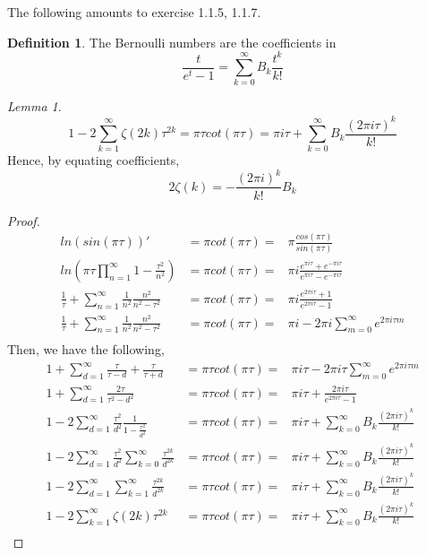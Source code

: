 \documentclass[11pt]{article}
\theoremstyle{plain}
\theoremstyle{definition}
\newtheorem{definition}{Definition}[section]
\theoremstyle{example}
\theoremstyle{remark}
\theoremstyle{lemma}
\newtheorem{lemma}{Lemma}[section]
\theoremstyle{proposition}
\theoremstyle{Problem}
\theoremstyle{Solution}
\theoremstyle{theorem}
\theoremstyle{corollary}
\begin{document}
The following amounts to exercise 1.1.5, 1.1.7.
\begin{definition}
The Bernoulli numbers are the coefficients in 
$$\frac{t}{e^t-1} = \sum_{k=0}^\infty B_k\frac{t^k}{k!}$$
\end{definition}
\begin{lemma}
$$1-2\sum_{k=1}^{\infty}\zeta(2k)\tau^{2k} = \pi \tau cot(\pi\tau) = \pi i\tau + \sum_{k=0}^{\infty}B_k\frac{(2\pi i\tau)^k}{k!}$$
Hence, by equating coefficients,
$$2\zeta(k) = -\frac{(2\pi i)^k}{k!} B_k$$
\end{lemma}
\begin{proof}
\begin{eqnarray*}
ln(sin(\pi\tau))' &= \pi cot(\pi \tau) =& \pi\frac{cos(\pi\tau)}{sin(\pi\tau)}\\
ln(\pi\tau\prod_{n=1}^\infty1-\frac{\tau^2}{n^2}) &= \pi cot(\pi\tau) =& \pi i\frac{e^{\pi i\tau}+e^{-\pi i\tau}}{e^{\pi i\tau}-e^{-\pi i\tau}}\\
\frac{1}{\tau} + \sum_{n=1}^\infty\frac{1}{n^2} \frac{n^2}{n^2-\tau^2} &= \pi cot(\pi\tau) =& \pi i \frac{e^{2\pi i\tau}+1}{e^{2\pi i\tau}-1}\\
\frac{1}{\tau} + \sum_{n=1}^\infty\frac{1}{n^2} \frac{n^2}{n^2-\tau^2} &= \pi cot(\pi\tau) =& \pi i - 2\pi i \sum_{m=0}^\infty e^{2\pi i \tau m}\\
\end{eqnarray*}
Then, we have the following,
\begin{eqnarray*}
1+\sum_{d=1}^\infty\frac{\tau}{\tau-d}+\frac{\tau}{\tau+d} &= \pi \tau cot(\pi\tau) =& \pi i\tau - 2\pi i \tau\sum_{m=0}^\infty e^{2\pi i \tau m} \\
1+\sum_{d=1}^\infty\frac{2\tau}{\tau^2-d^2} &= \pi \tau cot(\pi\tau) =& \pi i\tau + \frac{2\pi i\tau}{e^{2\pi i\tau} -1} \\
1-2\sum_{d=1}^\infty \frac{\tau^2}{d^2}\frac{1}{1-\frac{\tau^2}{d^2}} &= \pi \tau cot(\pi\tau) =& \pi i\tau + \sum_{k=0}^\infty B_k\frac{(2\pi i \tau)^k}{k!}\\
1-2\sum_{d=1}^\infty \frac{\tau^2}{d^2}\sum_{k=0}^\infty \frac{\tau^{2k}}{d^{2k}} &= \pi \tau cot(\pi\tau) =& \pi i\tau + \sum_{k=0}^\infty B_k\frac{(2\pi i \tau)^k}{k!}\\
1-2\sum_{d=1}^\infty\sum_{k=1}^\infty \frac{\tau^{2k}}{d^{2k}} &= \pi \tau cot(\pi\tau) =& \pi i\tau + \sum_{k=0}^\infty B_k\frac{(2\pi i \tau)^k}{k!}\\
1-2\sum_{k=1}^\infty \zeta(2k)\tau^{2k} &= \pi \tau cot(\pi\tau) =& \pi i\tau + \sum_{k=0}^\infty B_k\frac{(2\pi i \tau)^k}{k!}\\
\end{eqnarray*}
\end{proof}
\end{document}

